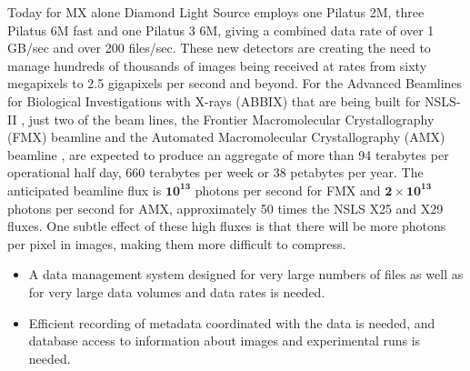 \documentclass[11pt]{a0poster}
\begin{document}
\begin{minipage}[]{0.29\linewidth}
Today for MX alone Diamond Light
Source employs one Pilatus 2M, three Pilatus 6M fast and one Pilatus 3
6M, giving a combined data rate of over 1 GB/sec and over 200 files/sec.
These new detectors are creating the need to manage hundreds of thousands of
images being received at rates from sixty megapixels to 2.5 gigapixels per second and beyond.
For the Advanced Beamlines for Biological Investigations with 
X-rays (ABBIX) that are being built for NSLS-II \cite{Hendrickson2012}, just two of the beam lines,
the Frontier Macromolecular Crystallography (FMX) beamline and the Automated Macromolecular Crystallography (AMX) beamline \cite{Schneider2012}, are expected to produce an aggregate of more than 94 terabytes per operational half day,
 660 terabytes per week or 38 petabytes per year.   The anticipated beamline flux is $\mathbf{10^{13}}$ photons per second for FMX and  $\mathbf{2 \times 10^{13}}$ photons 
per second for AMX, approximately 50 times the NSLS X25 and X29 fluxes.  One subtle effect of
these high fluxes is that there will be more photons per pixel in images, making them more
difficult to compress.



\begin{itemize}
\item{A data management system designed for very large numbers of files as well as
for very large data volumes and data rates is needed.}
\item{Efficient recording of metadata coordinated with the data is needed, and database
 access to information about images and experimental runs is needed.}
\end{itemize}
 

\end{minipage}
\end{document}
